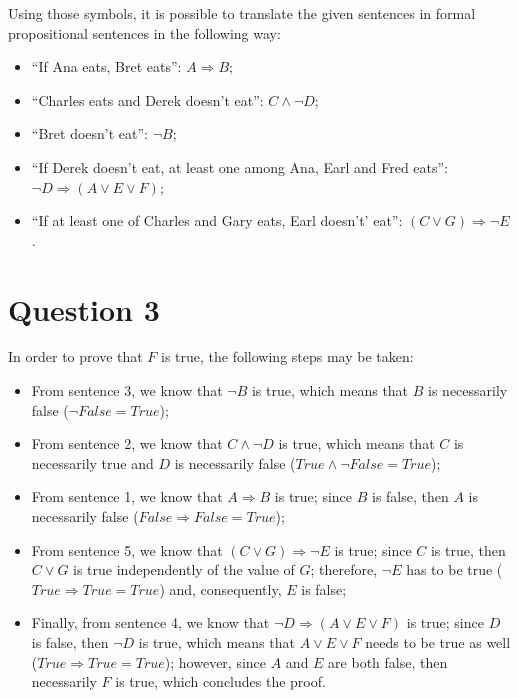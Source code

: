 \documentclass[letterpaper,headings=standardclasses]{scrartcl}
\begin{document}
Using those symbols, it is possible to translate the given sentences in formal propositional sentences in the following way:

\begin{itemize}
    \item ``If Ana eats, Bret eats'': $A \Rightarrow B$;
    \item ``Charles eats and Derek doesn't eat'': $C \wedge \neg D$;
    \item ``Bret doesn't eat'': $\neg B$;
    \item ``If Derek doesn't eat, at least one among Ana, Earl and Fred eats'': $\neg D \Rightarrow (A \vee E \vee F)$;
    \item ``If at least one of Charles and Gary eats, Earl doesn't' eat'': $(C \vee G) \Rightarrow \neg E$.
\end{itemize}

\section{Question 3}

In order to prove that $F$ is true, the following steps may be taken:

\begin{itemize}
    \item From sentence 3, we know that $\neg B$ is true, which means that $B$ is necessarily false ($\neg False = True$);
    \item From sentence 2, we know that $C \wedge \neg D$ is true, which means that $C$ is necessarily true and $D$ is necessarily false ($True \wedge \neg False = True$);
    \item From sentence 1, we know that $A \Rightarrow B$ is true; since $B$ is false, then $A$ is necessarily false ($False \Rightarrow False = True$);
    \item From sentence 5, we know that $(C \vee G) \Rightarrow \neg E$ is true; since $C$ is true, then $C \vee G$ is true independently of the value of $G$; therefore, $\neg E$ has to be true ($True \Rightarrow True = True$) and, consequently, $E$ is false;
    \item Finally, from sentence 4, we know that $\neg D \Rightarrow (A \vee E \vee F)$ is true; since $D$ is false, then $\neg D$ is true, which means that $A \vee E \vee F$ needs to be true as well ($True \Rightarrow True = True$); however, since $A$ and $E$ are both false, then necessarily $F$ is true, which concludes the proof.
\end{itemize}
\end{document}
